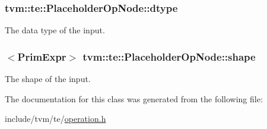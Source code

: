 \subsubsection[{\texorpdfstring{dtype}{dtype}}]{ tvm\+::te\+::\+Placeholder\+Op\+Node\+::dtype}\hypertarget{classtvm_1_1te_1_1PlaceholderOpNode_a4c0ad4ece5214f3638a101c3f4aef38b}{}\label{classtvm_1_1te_1_1PlaceholderOpNode_a4c0ad4ece5214f3638a101c3f4aef38b}


The data type of the input. 

\subsubsection[{\texorpdfstring{shape}{shape}}]{$<${\bf Prim\+Expr}$>$ tvm\+::te\+::\+Placeholder\+Op\+Node\+::shape}\hypertarget{classtvm_1_1te_1_1PlaceholderOpNode_a301fb989a618e248d69120f6c7b33c3f}{}\label{classtvm_1_1te_1_1PlaceholderOpNode_a301fb989a618e248d69120f6c7b33c3f}


The shape of the input. 



The documentation for this class was generated from the following file\+:\begin{DoxyCompactItemize}
\item 
include/tvm/te/\hyperlink{operation_8h}{operation.\+h}\end{DoxyCompactItemize}
